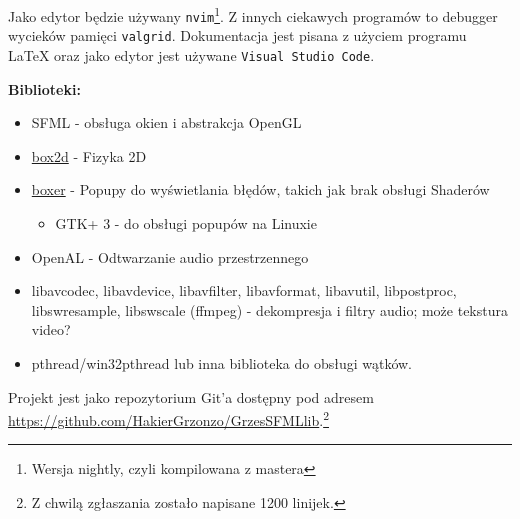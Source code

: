 \documentclass[a4paper,11pt]{article}
\begin{document}
Jako edytor będzie używany \texttt{nvim}\footnote{Wersja nightly, czyli kompilowana z mastera}. Z innych ciekawych programów to debugger wycieków pamięci \texttt{valgrid}. Dokumentacja jest pisana z użyciem programu \LaTeX{} oraz jako edytor jest używane \texttt{Visual Studio Code}.


\vspace{5mm}

\textbf{Biblioteki:}
\begin{itemize}
    \item SFML - obsługa okien i abstrakcja OpenGL
    \item \href{https://box2d.org/}{box2d} - Fizyka 2D
    \item \href{https://github.com/aaronmjacobs/Boxer}{boxer} - Popupy do wyświetlania błędów, takich jak brak obsługi Shaderów
    \begin{itemize}
        \item GTK+ 3 - do obsługi popupów na Linuxie
    \end{itemize}
    \item OpenAL - Odtwarzanie audio przestrzennego
    \item libavcodec, libavdevice, libavfilter, libavformat, libavutil, libpostproc, libswresample, libswscale (ffmpeg) - dekompresja i filtry audio; może tekstura video?
    \item pthread/win32pthread lub inna biblioteka do obsługi wątków.
\end{itemize}


Projekt jest jako repozytorium Git'a dostępny pod adresem \url{https://github.com/HakierGrzonzo/GrzesSFMLlib}.\footnote{Z chwilą zgłaszania zostało napisane 1200 linijek.}
\end{document}

